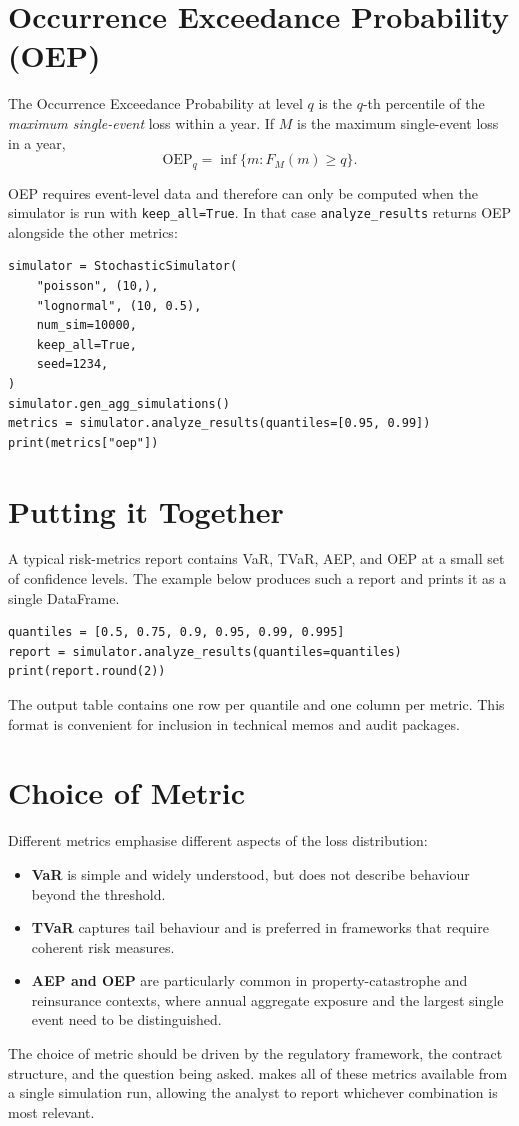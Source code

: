 \section{Occurrence Exceedance Probability (OEP)}

The Occurrence Exceedance Probability at level $q$ is the $q$-th
percentile of the \emph{maximum single-event} loss within a year. If
$M$ is the maximum single-event loss in a year,
\[
    \mathrm{OEP}_q = \inf \{ m : F_M(m) \geq q \}.
\]

OEP requires event-level data and therefore can only be computed when
the simulator is run with \texttt{keep\_all=True}. In that case
\texttt{analyze\_results} returns OEP alongside the other metrics:

\begin{lstlisting}[style=pythonstyle]
simulator = StochasticSimulator(
    "poisson", (10,),
    "lognormal", (10, 0.5),
    num_sim=10000,
    keep_all=True,
    seed=1234,
)
simulator.gen_agg_simulations()
metrics = simulator.analyze_results(quantiles=[0.95, 0.99])
print(metrics["oep"])
\end{lstlisting}

\section{Putting it Together}

A typical risk-metrics report contains VaR, TVaR, AEP, and OEP at a
small set of confidence levels. The example below produces such a
report and prints it as a single DataFrame.

\begin{lstlisting}[style=pythonstyle]
quantiles = [0.5, 0.75, 0.9, 0.95, 0.99, 0.995]
report = simulator.analyze_results(quantiles=quantiles)
print(report.round(2))
\end{lstlisting}

The output table contains one row per quantile and one column per
metric. This format is convenient for inclusion in technical memos and
audit packages.

\section{Choice of Metric}

Different metrics emphasise different aspects of the loss distribution:

\begin{itemize}[leftmargin=*]
    \item \textbf{VaR} is simple and widely understood, but does not
          describe behaviour beyond the threshold.
    \item \textbf{TVaR} captures tail behaviour and is preferred in
          frameworks that require coherent risk measures.
    \item \textbf{AEP and OEP} are particularly common in
          property-catastrophe and reinsurance contexts, where annual
          aggregate exposure and the largest single event need to be
          distinguished.
\end{itemize}

The choice of metric should be driven by the regulatory framework, the
contract structure, and the question being asked. \actsim makes all of
these metrics available from a single simulation run, allowing the
analyst to report whichever combination is most relevant.
